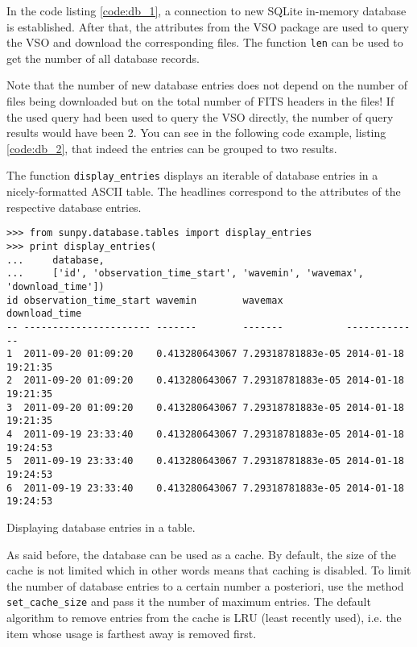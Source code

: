 In the code listing \ref{code:db_1}, a connection to new SQLite in-memory
database is established. After that, the attributes from the \textsc{VSO}
package are used to query the \textsc{VSO} and download the corresponding
files. The function \texttt{len} can be used to get the number of all database
records.

Note that the number of new database entries does not depend on the
number of files being downloaded but on the total number of \textsc{FITS}
headers in the files! If the used query had been used to query the \textsc{VSO}
directly, the number of query results would have been 2. You can see in the
following code example, listing \ref{code:db_2}, that indeed the entries can
be grouped to two results.

The function \texttt{display\_entries} displays an iterable of database entries
in a nicely-formatted \textsc{ASCII} table. The headlines correspond to the
attributes of the respective database entries.

\begin{listing}
\begin{verbatim}
>>> from sunpy.database.tables import display_entries
>>> print display_entries(
...     database,
...     ['id', 'observation_time_start', 'wavemin', 'wavemax', 'download_time'])
id observation_time_start wavemin        wavemax           download_time      
-- ---------------------- -------        -------           -------------      
1  2011-09-20 01:09:20    0.413280643067 7.29318781883e-05 2014-01-18 19:21:35
2  2011-09-20 01:09:20    0.413280643067 7.29318781883e-05 2014-01-18 19:21:35
3  2011-09-20 01:09:20    0.413280643067 7.29318781883e-05 2014-01-18 19:21:35
4  2011-09-19 23:33:40    0.413280643067 7.29318781883e-05 2014-01-18 19:24:53
5  2011-09-19 23:33:40    0.413280643067 7.29318781883e-05 2014-01-18 19:24:53
6  2011-09-19 23:33:40    0.413280643067 7.29318781883e-05 2014-01-18 19:24:53
\end{verbatim}
\caption{Displaying database entries in a table.}
\label{code:db_2}
\end{listing}

As said before, the database can be used as a cache. By default, the size of
the cache is not limited which in other words means that caching is disabled.
To limit the number of database entries to a certain number a posteriori, use
the method \texttt{set\_cache\_size} and pass it the number of maximum entries.
The default algorithm to remove entries from the cache is \textsc{LRU}
(least recently used), i.e. the item whose usage is farthest away is removed
first.  %
